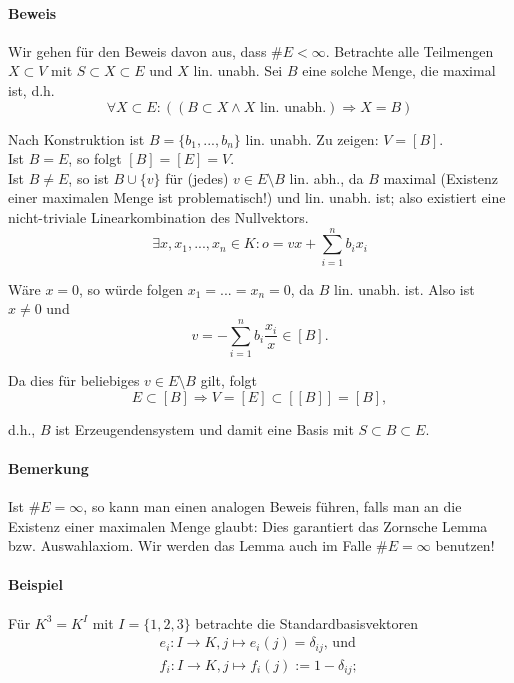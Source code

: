 \paragraph{Beweis}
    Wir gehen für den Beweis davon aus, dass $\#E<\infty$. Betrachte alle Teilmengen $X\subset V$ mit $S\subset X\subset E$ und $X$ lin. unabh. Sei $B$ eine solche Menge, die maximal ist, d.h.
    \begin{equation*}
        \forall X\subset E: ((B\subset X\land X\text{ lin. unabh.}) \Rightarrow X= B)
    \end{equation*}
    
    Nach Konstruktion ist $B=\{b_1,...,b_n\}$ lin. unabh. Zu zeigen: $V=[B]$.\\
    Ist $B=E$, so folgt $[B]=[E]=V$.\\
    Ist $B\neq E$, so ist $B\cup \{v\} $ für (jedes) $v\in E\setminus B$ lin. abh., da $B$ maximal (Existenz einer maximalen Menge ist problematisch!) und lin. unabh. ist; also existiert eine nicht-triviale Linearkombination des Nullvektors.
    \begin{equation*}
    \exists x,x_1,...,x_n \in K: o=vx+\sum^n_{i=1}b_ix_i
    \end{equation*}

    Wäre $x=0$, so würde folgen $x_1=...=x_n=0$, da $B$ lin. unabh. ist. 
    Also ist $x\neq 0$ und 
    \begin{equation*}
    	v=-\sum^n_{i=1} b_i\frac{x_i}{x} \in [B].
    \end{equation*}
    
    Da dies für beliebiges $v\in E\setminus B$ gilt, folgt
    \begin{equation*}
    	E\subset [B] \Rightarrow V=[E]\subset [[B]] = [B],
    \end{equation*}
    
    d.h., $ B $ ist Erzeugendensystem und damit eine Basis mit $S\subset B\subset E$.

\paragraph{Bemerkung}
    Ist $\#E = \infty$, so kann man einen analogen Beweis führen, falls man an die Existenz einer maximalen Menge glaubt: Dies garantiert das Zornsche Lemma bzw. Auswahlaxiom.
    Wir werden das Lemma auch im Falle $\#E = \infty$ benutzen!

\paragraph{Beispiel}
    Für $K^3=K^I$ mit $I=\{1,2,3\}$ betrachte die Standardbasisvektoren 
    \begin{gather*}
        e_i:I\to K, j\mapsto e_i(j) = \delta_{ij}\text{, und }\\
        f_i: I\to K, j\mapsto f_i(j):= 1-\delta_{ij};
    \end{gather*}

